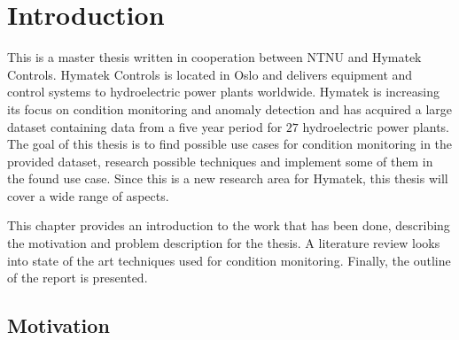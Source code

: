 
\chapter{Introduction}\label{cha:introduction}
%

This is a master thesis written in cooperation between NTNU and Hymatek Controls. Hymatek Controls is located in Oslo and delivers equipment and control systems to hydroelectric power plants worldwide. Hymatek is increasing its focus on condition monitoring and anomaly detection and has acquired a large dataset containing data from a five year period for $27$ hydroelectric power plants. The goal of this thesis is to find possible use cases for condition monitoring in the provided dataset, research possible techniques and implement some of them in the found use case. Since this is a new research area for Hymatek, this thesis will cover a wide range of aspects. 

This chapter provides an introduction to the work that has been done, describing the motivation and problem description for the thesis. A literature review looks into state of the art techniques used for condition monitoring. Finally, the outline of the report is presented. 


\section{Motivation}\label{sec:motivation}


